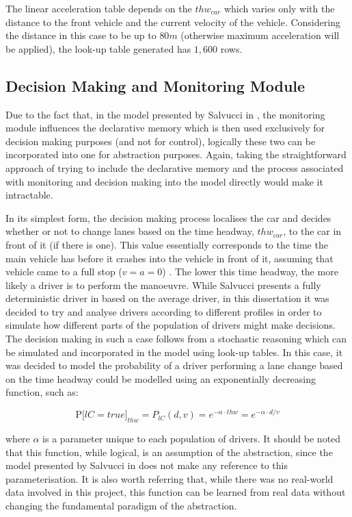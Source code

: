 The linear acceleration table depends on the $thw_{car}$ which varies only with the distance to the front vehicle and the current velocity of the vehicle. Considering the distance in this case to be up to $80 m$ (otherwise maximum acceleration will be applied), the look-up table generated has $1,600$ rows.

\subsection{Decision Making and Monitoring Module}

Due to the fact that, in the model presented by Salvucci in \cite{salvucci_1}, the monitoring module influences the declarative memory which is then used exclusively for decision making purposes (and not for control), logically these two can be incorporated into one for abstraction purposes. Again, taking the straightforward approach of trying to include the declarative memory and the process associated with monitoring and decision making into the model directly would make it intractable. 

In its simplest form, the decision making process localises the car and decides whether or not to change lanes based on the time headway, $thw_{car}$, to the car in front of it (if there is one). This value essentially corresponds to the time the main vehicle has before it crashes into the vehicle in front of it, assuming that vehicle came to a full stop ($v = a = 0$) \cite{thw}. The lower this time headway, the more likely a driver is to perform the manoeuvre. While Salvucci presents a fully deterministic driver in \cite{salvucci_1} based on the average driver, in this dissertation it was decided to try and analyse drivers according to different profiles in order to simulate how different parts of the population of drivers might make decisions. The decision making in such a case follows from a stochastic reasoning which can be simulated and incorporated in the model using look-up tables. In this case, it was decided to model the probability of a driver performing a lane change based on the time headway could be modelled using an exponentially decreasing function, such as:

\begin{equation}
	\text{P[}lC = true\text{]}_{thw} = P_{lC}(d,v) = e^{-\alpha\cdot thw} = e^{-\alpha\cdot d/v}
\end{equation}

where $\alpha$ is a parameter unique to each population of drivers. It should be noted that this function, while logical, is an assumption of the abstraction, since the model presented by Salvucci in \cite{salvucci_1} does not make any reference to this parameterisation. It is also worth referring that, while there was no real-world data involved in this project, this function can be learned from real data without changing the fundamental paradigm of the abstraction.

